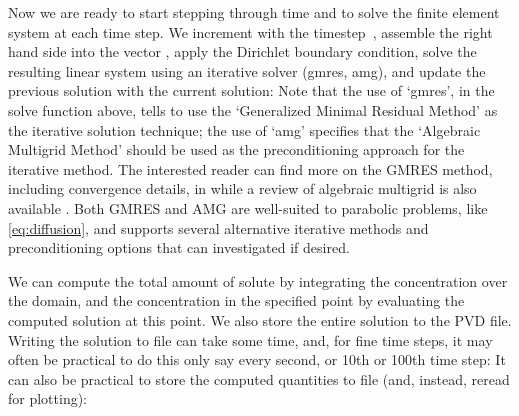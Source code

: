Now we are ready to start stepping through time and to solve the finite
element system at each time step. We increment
 with the timestep~, assemble
the right hand side into the vector , apply the
Dirichlet boundary condition, solve the resulting linear system using
an iterative solver (gmres, amg), and update the previous solution
with the current solution:
Note that the use of `gmres', in the solve function above, tells {\fenics} to 
use the `Generalized Minimal Residual Method' as the iterative solution 
technique; the use of `amg' specifies that the `Algebraic Multigrid Method' 
should be used as the preconditioning approach for the iterative method.  The 
interested reader can find more on the GMRES method, including convergence 
details, in \cite{greenbaum1997} while a review of algebraic multigrid 
is also available \cite{stuben2001}.  Both GMRES and AMG are well-suited to 
parabolic problems, like \eqref{eq:diffusion}, and {\fenics} supports several 
alternative iterative methods and preconditioning options 
\cite{langtangen2016solving} that can investigated if desired.  %


We can compute the total amount of solute by integrating the concentration
over the domain, and the concentration in the specified point by
evaluating the computed solution at this point. We also store the
entire solution to the PVD file. Writing the solution to file can take
some time, and, for fine time steps, it may often be practical to 
do this only say every second, or 10th or 100th time step:
It can also be practical to store the computed quantities to file
(and, instead, reread for plotting):

